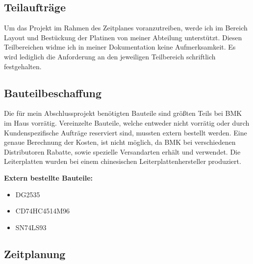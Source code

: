 \subsection{Teilaufträge}
Um das Projekt im Rahmen des Zeitplanes voranzutreiben, werde ich im Bereich Layout und Bestückung der Platinen von meiner Abteilung unterstützt. Diesen Teilbereichen widme ich in meiner Dokumentation keine Aufmerksamkeit. Es wird lediglich die Anforderung an den jeweiligen Teilbereich schriftlich festgehalten. 

\subsection{Bauteilbeschaffung}
Die für mein Abschlussprojekt benötigten Bauteile sind größten Teils bei BMK im Haus vorrätig. Vereinzelte Bauteile, welche entweder nicht vorrätig oder durch \glqq Kundenspezifische Aufträge \grqq reserviert sind, mussten extern bestellt werden. Eine genaue Berechnung der Kosten, ist nicht möglich, da BMK bei verschiedenen Distributoren Rabatte, sowie spezielle Versandarten erhält und verwendet. Die Leiterplatten wurden bei einem chinesischen Leiterplattenhersteller produziert. 

\newpage

\textbf{Extern bestellte Bauteile:} 

\begin{itemize}
	\item{DG2535}
	
	\item{CD74HC4514M96}
	
	\item{SN74LS93}
\end{itemize}

\renewcommand{\arraystretch}{2}
\subsection{Zeitplanung}

